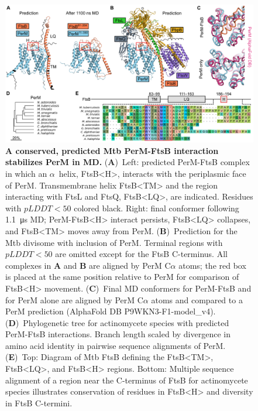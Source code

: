 \documentclass[twocolumn,pdflatex,sn-nature]{sn-jnl}%
\def\textsuperscript#1{<#1>}%
\newcommand\mtb{Mtb}
\newcommand\ftsbTM{FtsB\textsuperscript{TM}}
\newcommand\ftsbLQ{FtsB\textsuperscript{LQ}}
\newcommand\ftsbH{FtsB\textsuperscript{H}}
\begin{document}
\begin{figure}[t]
    \centering
    \includegraphics[width=1.0\textwidth]{../figures/fig1_1.png}
    \caption{
        \textbf{A conserved, predicted \mtb{} PerM-FtsB interaction stabilizes PerM in MD.}
        (\textbf{A})~Left: predicted PerM-FtsB complex in which an $\alpha$~helix, \ftsbH{}, interacts with the periplasmic face of PerM. Transmembrane helix \ftsbTM{} and the region interacting with FtsL and FtsQ, \ftsbLQ{}, are indicated. Residues with $pLDDT < 50$ colored black. Right: final conformer following \qty{1.1}{\us} MD; PerM-\ftsbH{} interact persists, \ftsbLQ{} collapses, and \ftsbTM{} moves away from PerM.
        (\textbf{B})~Prediction for the \mtb{} divisome with inclusion of PerM. Terminal regions with $pLDDT < 50$ are omitted except for the FtsB C-terminus. All complexes in \textbf{A} and \textbf{B} are aligned by PerM C$\alpha$ atoms; the red box is placed at the same position relative to PerM for comparison of \ftsbH{} movement.
        (\textbf{C})~Final MD conformers for PerM-FtsB and for PerM alone are aligned by PerM C$\alpha$ atoms and compared to a PerM prediction  (AlphaFold DB P9WKN3-F1-model{\_}v4).
        (\textbf{D})~Phylogenetic tree for actinomycete species with predicted PerM-FtsB interactions. Branch length scaled by divergence in amino acid identity in pairwise sequence alignments of PerM.
        (\textbf{E})~Top: Diagram of \mtb{} FtsB defining the \ftsbTM{}, \ftsbLQ{}, and \ftsbH{} regions. Bottom: Multiple sequence alignment of a region near the C-terminus of FtsB for actinomycete species illustrates conservation of residues in \ftsbH{} and diversity in FtsB C-termini.
    }\label{fig1_1}
\end{figure}
\end{document}
